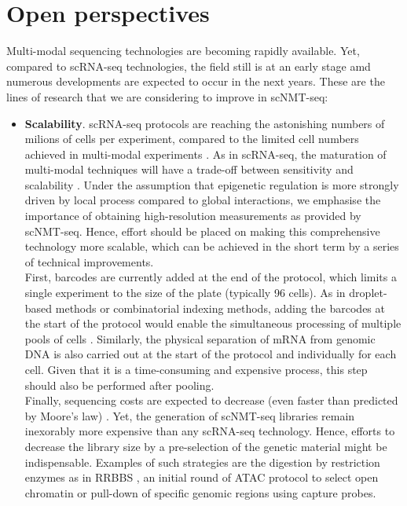 \section{Open perspectives}

Multi-modal sequencing technologies are becoming rapidly available. Yet, compared to scRNA-seq technologies, the field still is at an early stage amd numerous developments are expected to occur in the next years. These are the lines of research that we are considering to improve in scNMT-seq:

\begin{itemize}

	\item \textbf{Scalability}. scRNA-seq protocols are reaching the astonishing numbers of milions of cells per experiment, compared to the limited cell numbers achieved in multi-modal experiments \cite{Cao2019,Cao2018,Guo2017}. As in scRNA-seq, the maturation of multi-modal techniques will have a trade-off between sensitivity and scalability \cite{Chappell2018}. Under the assumption that epigenetic regulation is more strongly driven by local process compared to global interactions\cite{XX}, we emphasise the importance of obtaining high-resolution measurements as provided by scNMT-seq. Hence, effort should be placed on making this comprehensive technology more scalable, which can be achieved in the short term by a series of technical improvements.\\
	First, barcodes are currently added at the end of the protocol, which limits a single experiment to the size of the plate (typically 96 cells). As in droplet-based methods or combinatorial indexing methods, adding the barcodes at the start of the protocol would enable the simultaneous processing of multiple pools of cells \cite{droplet,sci-met}.
	Similarly, the physical separation of mRNA from genomic DNA is also carried out at the start of the protocol and individually for each cell. Given that it is a time-consuming and expensive process, this step should also be performed after pooling.\\
	Finally, sequencing costs are expected to decrease (even faster than predicted by Moore's law) \cite{Svensson2018}. Yet, the generation of scNMT-seq libraries remain inexorably more expensive than any scRNA-seq technology. Hence, efforts to decrease the library size by a pre-selection of the genetic material might be indispensable. Examples of such strategies are the digestion by restriction enzymes as in RRBBS \cite{Guo2013}, an initial round of ATAC protocol to select open chromatin \cite{Spektor2018} or pull-down of specific genomic regions using capture probes.


\end{itemize}
